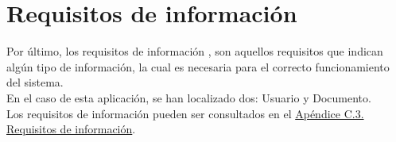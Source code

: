 \section{Requisitos de información}

Por último, los requisitos de información \cite{requisitos}, son aquellos requisitos que indican algún tipo de información, la cual es necesaria para el correcto funcionamiento del sistema.
\\

En el caso de esta aplicación, se han localizado dos: Usuario y Documento.
\\

Los requisitos de información pueden ser consultados en el \hyperref[APRequisitosInformacion]{Apéndice C.3. Requisitos de información}.